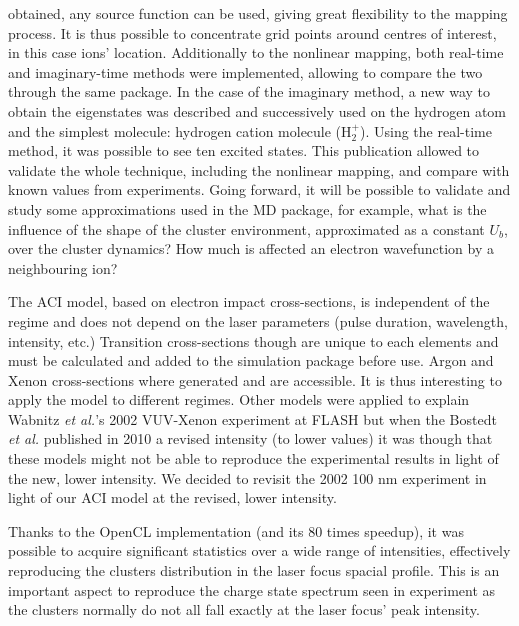 obtained, any source function can be used, giving great flexibility to the
mapping process. It is thus possible to concentrate grid points around centres
of interest, in this case ions' location. Additionally to the nonlinear mapping,
both real-time and imaginary-time methods were implemented, allowing to compare
the two through the same package. In the case of the imaginary method, a new
way to obtain the eigenstates was described and successively used on the
hydrogen atom and the simplest molecule: hydrogen cation molecule (H$_{2}^{+}$).
Using the real-time method, it was possible to see ten excited states. This
publication allowed to validate the whole technique, including the nonlinear
mapping, and compare with known values from experiments. Going forward, it will
be possible to validate and study some approximations used in the MD package,
for example, what is the influence of the shape of the cluster environment,
approximated as a constant $U_b$, over the cluster dynamics? How much is
affected an electron wavefunction by a neighbouring ion?

The ACI model, based on electron impact cross-sections, is independent of the
regime and does not depend on the laser parameters (pulse duration, wavelength,
intensity, etc.) Transition cross-sections though are unique to each elements
and must be calculated and added to the simulation package before use. Argon
and Xenon cross-sections where generated and are accessible. It is thus
interesting to apply the model to different regimes. Other models were applied
to explain Wabnitz \textit{et al.}'s 2002 VUV-Xenon experiment at FLASH but when the
Bostedt \textit{et al.} published in 2010 a revised intensity (to lower values) it was
though that these models might not be able to reproduce the experimental results
in light of the new, lower intensity. We decided to revisit the 2002 100 nm
experiment in light of our ACI model at the revised, lower intensity.

Thanks to the OpenCL implementation (and its 80 times speedup), it was possible
to acquire significant statistics over a wide range of intensities, effectively
reproducing the clusters distribution in the laser focus spacial profile. This
is an important aspect to reproduce the charge state spectrum seen in experiment
as the clusters normally do not all fall exactly at the laser focus' peak
intensity.

